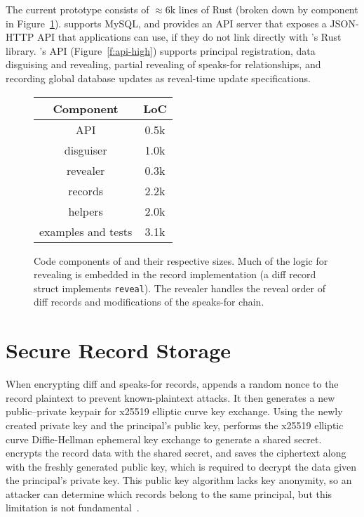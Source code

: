 
The current \sys prototype consists of $\approx6$k lines of Rust (broken down by component in
Figure~\ref{f:loc}). 
%
\sys supports MySQL, and provides an API server that exposes a JSON-HTTP API that applications
can use, if they do not link directly with \sys's Rust library.
%
\sys's API (Figure~\ref{f:api-high}) supports principal registration, data disguising and revealing,
partial revealing of speaks-for relationships, and recording global database
updates as reveal-time update specifications.
%

\begin{figure}[h]
\centering
\begin{tabular}{cc}
    \textbf{Component} & \textbf{LoC} \\
\hline
    API & 0.5k\\
    disguiser & 1.0k\\
    revealer & 0.3k \\
    records & 2.2k \\
    helpers & 2.0k \\
    examples and tests & 3.1k\\

\end{tabular}
    \caption[\sys's code components and LoC.]{Code components of \sys and their respective sizes. Much
    of the logic for revealing is embedded in the record implementation (\eg a
    diff record struct implements \texttt{reveal}). The revealer handles the
    reveal order of diff records and modifications of the speaks-for
    chain.} 
    \label{f:loc}
\end{figure}

%


\section{Secure Record Storage}
%
When encrypting diff and speaks-for records, \sys appends a random nonce to
the record plaintext to prevent known-plaintext attacks.
%
It then generates a new public--private keypair for x25519 elliptic curve key
exchange.
%
Using the newly created private key and the principal's public key, \sys
performs the x25519 elliptic curve Diffie-Hellman ephemeral key exchange to
generate a shared secret.
%
\sys encrypts the record data with the shared secret, and saves the ciphertext
along with the freshly generated public key, which is required to decrypt the
data given the principal's private key.
%
This public key algorithm lacks key anonymity, so an attacker can determine
which records belong to the same principal, but this limitation is not
fundamental~\cite{anonymous-keys}.

